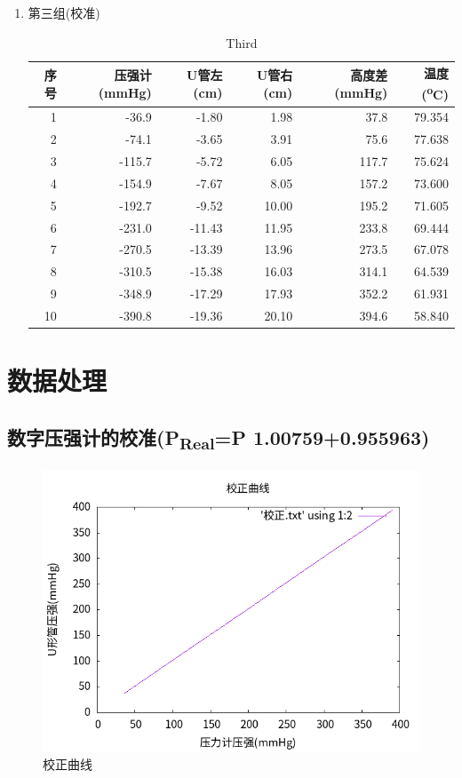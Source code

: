 \documentclass[11pt]{report}
\begin{document}
\begin{enumerate}
\item 第三组(校准)
\label{sec:orgde49c6c}
\begin{table}[htbp]
\caption{Third}
\centering
\begin{tabular}{rrrrrr}
序号 & 压强计(mmHg) & U管左(cm) & U管右(cm) & 高度差(mmHg) & 温度(\textsuperscript{o}C)\\
\hline
1 & -36.9 & -1.80 & 1.98 & 37.8 & 79.354\\
2 & -74.1 & -3.65 & 3.91 & 75.6 & 77.638\\
3 & -115.7 & -5.72 & 6.05 & 117.7 & 75.624\\
4 & -154.9 & -7.67 & 8.05 & 157.2 & 73.600\\
5 & -192.7 & -9.52 & 10.00 & 195.2 & 71.605\\
6 & -231.0 & -11.43 & 11.95 & 233.8 & 69.444\\
7 & -270.5 & -13.39 & 13.96 & 273.5 & 67.078\\
8 & -310.5 & -15.38 & 16.03 & 314.1 & 64.539\\
9 & -348.9 & -17.29 & 17.93 & 352.2 & 61.931\\
10 & -390.8 & -19.36 & 20.10 & 394.6 & 58.840\\
\end{tabular}
\end{table}
\end{enumerate}

\chapter{数据处理}
\label{sec:org4f087fb}
\section{数字压强计的校准(P\textsubscript{Real}=P\texttimes{} 1.00759+0.955963)}
\label{sec:orgcb418fa}
\begin{figure}[htbp]
\centering
\includegraphics[width=.9\linewidth]{../img/校正.png}
\caption{校正曲线}
\end{figure}
\end{document}
